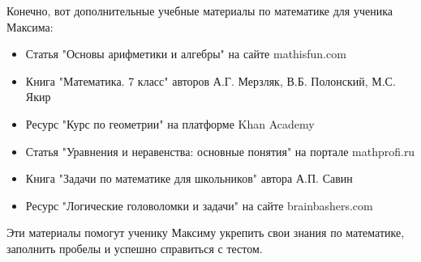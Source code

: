 \documentclass{article}
\begin{document}
Конечно, вот дополнительные учебные материалы по математике для ученика Максима:

\begin{itemize}
    \item Статья "Основы арифметики и алгебры" на сайте mathisfun.com
    \item Книга "Математика. 7 класс" авторов А.Г. Мерзляк, В.Б. Полонский, М.С. Якир
    \item Ресурс "Курс по геометрии" на платформе Khan Academy
    \item Статья "Уравнения и неравенства: основные понятия" на портале mathprofi.ru
    \item Книга "Задачи по математике для школьников" автора А.П. Савин
    \item Ресурс "Логические головоломки и задачи" на сайте brainbashers.com
\end{itemize}

Эти материалы помогут ученику Максиму укрепить свои знания по математике, заполнить пробелы и успешно справиться с тестом.
\end{document}

